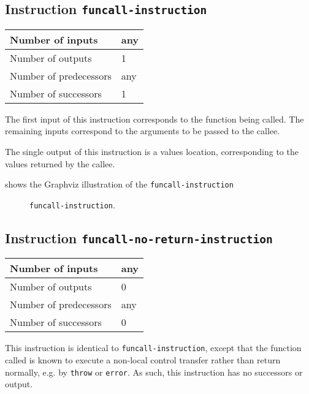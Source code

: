 \subsection{Instruction \texttt{funcall-instruction}}
\label{mir-instruction-funcall}

\begin{tabular}{|l|l|}
\hline
Number of inputs & any\\
\hline
Number of outputs & 1\\
\hline
Number of predecessors & any\\
\hline
Number of successors & 1\\
\hline
\end{tabular}

The first input of this instruction corresponds to the function being
called.  The remaining inputs correspond to the arguments to be passed
to the callee.

The single output of this instruction is a values location,
corresponding to the values returned by the callee.

 shows the Graphviz illustration of the
\texttt{funcall-instruction}

\begin{figure}
\begin{center}
\end{center}
\caption{\label{fig-funcall-instruction}
\texttt{funcall-instruction}.}
\end{figure}

\subsection{Instruction \texttt{funcall-no-return-instruction}}
\label{mir-instruction-funcall-no-return}

\begin{tabular}{|l|l|}
  \hline
  Number of inputs & any\\
  \hline
  Number of outputs & 0\\
  \hline
  Number of predecessors & any\\
  \hline
  Number of successors & 0\\
  \hline
\end{tabular}

This instruction is identical to \texttt{funcall-instruction}, except
that the function called is known to execute a non-local control
transfer rather than return normally, e.g. by \texttt{throw} or
\texttt{error}. As such, this instruction has no successors or output.

